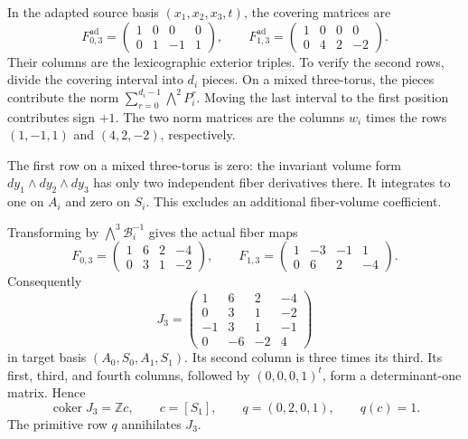 In the adapted source basis $(x_1,x_2,x_3,t)$, the covering matrices are
\[
F^{\mathrm{ad}}_{0,3}=
\begin{pmatrix}1&0&0&0\\0&1&-1&1\end{pmatrix},\qquad
F^{\mathrm{ad}}_{1,3}=
\begin{pmatrix}1&0&0&0\\0&4&2&-2\end{pmatrix}.
\]
Their columns are the lexicographic exterior triples.
To verify the second rows, divide the covering interval into $d_i$ pieces.
On a mixed three-torus, the pieces contribute the norm
$\sum_{r=0}^{d_i-1}\bigwedge^2P_i^r$.
Moving the last interval to the first position contributes sign $+1$.
The two norm matrices are the columns $w_i$ times the rows
$(1,-1,1)$ and $(4,2,-2)$, respectively.

The first row on a mixed three-torus is zero:
the invariant volume form $dy_1\wedge dy_2\wedge dy_3$
has only two independent fiber derivatives there.
It integrates to one on $A_i$ and zero on $S_i$.
This excludes an additional fiber-volume coefficient.

Transforming by $\bigwedge^3\mathcal B_i^{-1}$ gives the actual fiber maps
\begin{equation}\label{th:eq:F3}
F_{0,3}=\begin{pmatrix}1&6&2&-4\\0&3&1&-2\end{pmatrix},\qquad
F_{1,3}=\begin{pmatrix}1&-3&-1&1\\0&6&2&-4\end{pmatrix}.
\end{equation}
Consequently
\begin{equation}\label{th:eq:J3}
J_3=\begin{pmatrix}
1&6&2&-4\\0&3&1&-2\\-1&3&1&-1\\0&-6&-2&4
\end{pmatrix}
\end{equation}
in target basis $(A_0,S_0,A_1,S_1)$.
Its second column is three times its third.
Its first, third, and fourth columns, followed by $(0,0,0,1)^t$,
form a determinant-one matrix.
Hence
\begin{equation}\label{th:eq:c}
\operatorname{coker}J_3=\mathbb Zc,\qquad
c=[S_1],\qquad q=(0,2,0,1),\qquad q(c)=1.
\end{equation}
The primitive row $q$ annihilates $J_3$.

